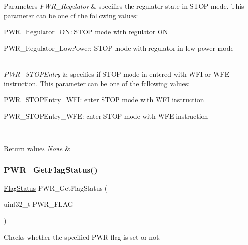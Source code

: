 \begin{DoxyParams}{Parameters}
{\em P\+W\+R\+\_\+\+Regulator} & specifies the regulator state in S\+T\+OP mode. This parameter can be one of the following values\+: \begin{DoxyItemize}
\item P\+W\+R\+\_\+\+Regulator\+\_\+\+ON\+: S\+T\+OP mode with regulator ON \item P\+W\+R\+\_\+\+Regulator\+\_\+\+Low\+Power\+: S\+T\+OP mode with regulator in low power mode \end{DoxyItemize}
\\
\hline
{\em P\+W\+R\+\_\+\+S\+T\+O\+P\+Entry} & specifies if S\+T\+OP mode in entered with W\+FI or W\+FE instruction. This parameter can be one of the following values\+: \begin{DoxyItemize}
\item P\+W\+R\+\_\+\+S\+T\+O\+P\+Entry\+\_\+\+W\+FI\+: enter S\+T\+OP mode with W\+FI instruction \item P\+W\+R\+\_\+\+S\+T\+O\+P\+Entry\+\_\+\+W\+FE\+: enter S\+T\+OP mode with W\+FE instruction \end{DoxyItemize}
\\
\hline
\end{DoxyParams}

\begin{DoxyRetVals}{Return values}
{\em None} & \\
\hline
\end{DoxyRetVals}
\mbox{\label{group___p_w_r___exported___functions_gaa980163a4d83304280ee34942464b4ec}} 
\subsubsection{\texorpdfstring{PWR\_GetFlagStatus()}{PWR\_GetFlagStatus()}}
{\footnotesize\ttfamily \mbox{\hyperlink{group___exported__types_ga89136caac2e14c55151f527ac02daaff}{Flag\+Status}} P\+W\+R\+\_\+\+Get\+Flag\+Status (\begin{DoxyParamCaption}\item[{uint32\+\_\+t}]{P\+W\+R\+\_\+\+F\+L\+AG }\end{DoxyParamCaption})}



Checks whether the specified P\+WR flag is set or not. 


